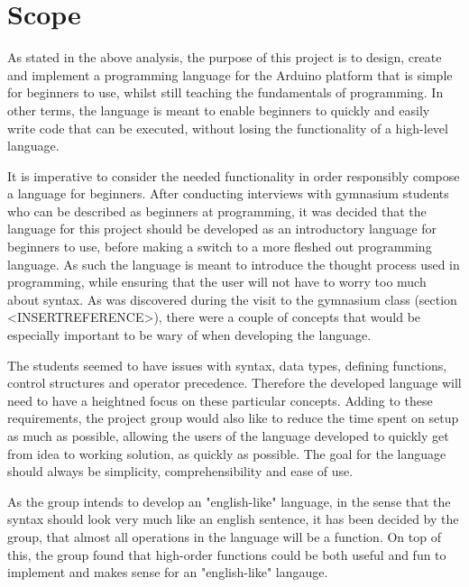 \section{Scope}
As stated in the above analysis, the purpose of this project is to design, create and implement a
programming language for the Arduino platform that is simple for beginners to use, whilst still teaching the
fundamentals of programming.
In other terms, the language is meant to enable beginners to quickly and easily write
code that can be executed, without losing the functionality of a high-level language.

It is imperative to consider the needed functionality in order responsibly compose a language for
beginners.
After conducting interviews with gymnasium students who can be described as beginners at programming,
it was decided that the language for this project should be developed as an introductory language for beginners to use, before making a switch to a more fleshed out programming language.
As such the language is meant to introduce the thought process used in programming, while ensuring that the user will not have to worry too much about syntax.
As was discovered during the visit to the gymnasium class (section <INSERTREFERENCE>), there were a couple of concepts that would be especially important to be wary of when developing the language.

The students seemed to have issues with syntax, data types, defining functions, control structures and operator precedence.
Therefore the developed language will need to have a heightned focus on these particular concepts. 
Adding to these requirements, the project group would also like to reduce the time spent on setup as much as possible, allowing the users of the language developed to quickly get from idea to working solution, as quickly as possible.
The goal for the language should always be simplicity, comprehensibility and ease of use.

As the group intends to develop an "english-like" language, in the sense that the syntax should look very much like an english sentence, it has been decided by the group, that almost all operations in the language will be a function. 
On top of this, the group found that high-order functions could be both useful and fun to implement and makes sense for an "english-like" langauge. 

